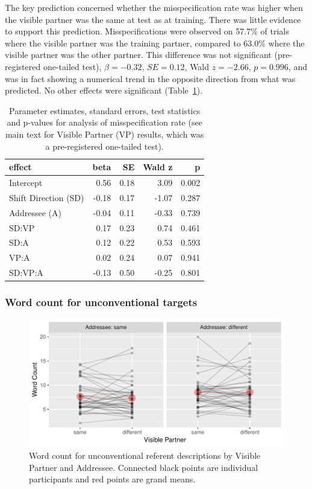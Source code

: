\documentclass[natbib,doc,a4paper]{apa6}
\begin{document}
The key prediction concerned whether the misspecification rate was higher when the visible partner was the same at test as at training. There was little evidence to support this prediction. Misspecifications were observed on 
57.7\%
of trials where the visible partner was the training partner, compared to 
63.0\%
where the visible partner was the other partner.
This difference was not significant (pre-registered one-tailed test), 
\(\beta = -0.32\), \(SE = 0.12\), Wald \(z = -2.66\), \(p = 0.996\), and was in fact showing a numerical trend in the opposite direction from what was predicted. No other effects were significant (Table~\ref{tbl:exp3-lmem}).

\begin{table}[ht]
\centering
\caption{Parameter estimates, standard errors, test statistics and p-values for analysis of misspecification rate (see main text for Visible Partner (VP) results, which was a pre-registered one-tailed test).} 
\label{tbl:exp3-lmem}
\begin{tabular}{lrrrr}
  \hline
effect & beta & SE & Wald z & p \\ 
  \hline
Intercept & 0.56 & 0.18 & 3.09 & 0.002 \\ 
  Shift Direction (SD) & -0.18 & 0.17 & -1.07 & 0.287 \\ 
  Addressee (A) & -0.04 & 0.11 & -0.33 & 0.739 \\ 
  SD:VP & 0.17 & 0.23 & 0.74 & 0.461 \\ 
  SD:A & 0.12 & 0.22 & 0.53 & 0.593 \\ 
  VP:A & 0.02 & 0.24 & 0.07 & 0.941 \\ 
  SD:VP:A & -0.13 & 0.50 & -0.25 & 0.801 \\ 
   \hline
\end{tabular}
\end{table}

\subsubsection*{Word count for unconventional targets}
\label{sec:orgdfd8df2}

\begin{figure}[htbp]
\centering
\includegraphics[width=.9\linewidth]{exp3/img/exp3-wc-plot.pdf}
\caption{\label{fig:orgbfd4e21}
Word count for unconventional referent descriptions by Visible Partner and Addressee. Connected black points are individual participants and red points are grand means.}
\end{figure}
\end{document}
